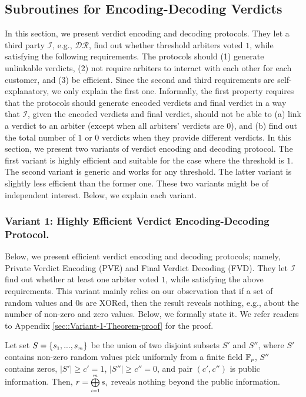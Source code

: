 
\subsection{Subroutines for  Encoding-Decoding Verdicts}


In this section, we present verdict encoding and decoding protocols. They let a third party $\mathcal{I}$, e.g., $\mathcal{DR}$, find out whether threshold  arbiters voted $1$, while satisfying the following  requirements.  The protocols should (1) generate unlinkable verdicts, (2)  not require arbiters to interact with each other for each customer, and (3) be  efficient. Since the second and third requirements are self-explanatory,  we only explain the first one.  Informally, the first property requires  that the protocols should generate encoded verdicts and final verdict in a way that $\mathcal{I}$,  given the encoded verdicts and final verdict, should not be able to (a)   link a  verdict to an arbiter (except when all arbiters' verdicts are $0$), and (b) find out the total number of $1$ or $0$ verdicts when they provide different verdicts.  In this section, we present two variants of verdict encoding and decoding protocol. The first variant is highly efficient and suitable for the case where the threshold is $1$. The second variant is  generic and works for any threshold. The latter variant is slightly less efficient than the former one. These two variants might be of independent interest. Below, we explain each variant. 


\subsubsection{Variant 1: Highly Efficient Verdict  Encoding-Decoding Protocol.}


Below, we present  efficient verdict encoding and decoding protocols; namely, Private Verdict Encoding (PVE) and Final Verdict Decoding (FVD). They  let $\mathcal{I}$ find out whether at least one arbiter voted $1$, while satisfying the above requirements.   This variant  mainly relies on our observation that   if   a set of random values and $0$s are XORed, then the result   reveals nothing, e.g.,  about the number of non-zero and  zero values. Below, we formally state it.  We refer readers to Appendix \ref{sec::Variant-1-Theorem-proof} for the proof.

\begin{theorem}\label{set-xor}
Let set $S=\{s_{\scriptscriptstyle 1},..., s_{\scriptscriptstyle m}\}$ be the union of  two disjoint subsets $S'$ and $S''$, where $S'$ contains non-zero random values pick uniformly  from a finite field $\mathbb{F}_{\scriptscriptstyle p}$, $S''$ contains zeros, $|S'|\geq c'=1$, $|S''|\geq c''=0$, and pair $(c',c'')$ is public information. Then, $r= \bigoplus\limits^{\scriptscriptstyle m}_{\scriptscriptstyle i=1} s_{\scriptscriptstyle i}$ reveals nothing beyond the public information.  
\end{theorem}

